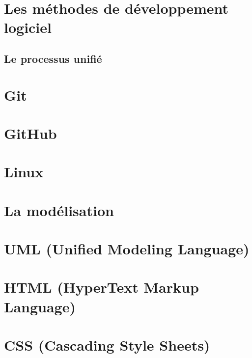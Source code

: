 \documentclass[12pt, a4paper]{report}
\begin{document}
    \section{Les méthodes de développement logiciel}\label{subsec:methode-de-developpement-logiciel}
    

    \subsection{Le processus unifié}\label{subsec:processus-unifie}
    

    \section{Git}\label{sec:git-1}
    

    \section{GitHub}\label{sec:github-1}
    

    \section{Linux}\label{sec:linux}
    
   
    \section{La modélisation}\label{sec:modelisation}
    

    \section{UML (Unified Modeling Language)}\label{sec:uml}
    

    \section{HTML (HyperText Markup Language)}\label{sec:html}
    

    \section{CSS (Cascading Style Sheets)}\label{sec:css}
    
\end{document}
